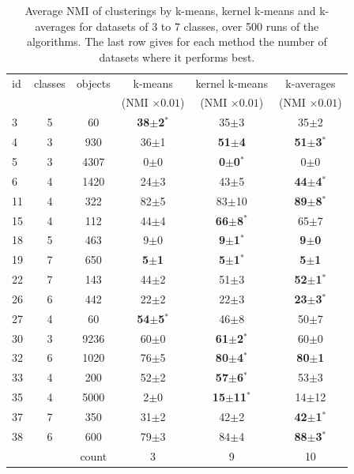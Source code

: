 \documentclass[a4paper,twoside]{article}
\begin{document}
   
\begin{table} 
\begin{center} 
\small 
 \setlength{\tabcolsep}{1em}
 \renewcommand{\arraystretch}{1.2}
\begin{tabular}{lccccc} 
id & classes & objects & k-means & kernel k-means & k-averages \\ 
&  &  & (NMI $\times 0.01$) & (NMI $\times 0.01$) & (NMI $\times 0.01$) \\ 
\hline 
 3 & 5 &   60 & \textbf{38$\pm$2$^*$} & 35$\pm$3 & 35$\pm$2 \\ 
 4 & 3 &  930 & 36$\pm$1 & \textbf{51$\pm$4} & \textbf{51$\pm$3$^*$} \\ 
 5 & 3 & 4307 & 0$\pm$0 & \textbf{0$\pm$0$^*$} & 0$\pm$0 \\ 
 6 & 4 & 1420 & 24$\pm$3 & 43$\pm$5 & \textbf{44$\pm$4$^*$} \\ 
11 & 4 &  322 &  82$\pm$5 & 83$\pm$10 & \textbf{ 89$\pm$8$^*$} \\ 
15 & 4 &  112 & 44$\pm$4 & \textbf{66$\pm$8$^*$} & 65$\pm$7 \\ 
18 & 5 &  463 & 9$\pm$0 & \textbf{9$\pm$1$^*$} & \textbf{9$\pm$0} \\ 
19 & 7 &  650 & \textbf{5$\pm$1} & \textbf{5$\pm$1$^*$} & \textbf{5$\pm$1} \\ 
22 & 7 &  143 & 44$\pm$2 & 51$\pm$3 & \textbf{52$\pm$1$^*$} \\ 
26 & 6 &  442 & 22$\pm$2 & 22$\pm$3 & \textbf{23$\pm$3$^*$} \\ 
27 & 4 &   60 & \textbf{54$\pm$5$^*$} & 46$\pm$8 & 50$\pm$7 \\ 
30 & 3 & 9236 & 60$\pm$0 & \textbf{61$\pm$2$^*$} & 60$\pm$0 \\ 
32 & 6 & 1020 & 76$\pm$5 & \textbf{80$\pm$4$^*$} & \textbf{80$\pm$1} \\ 
33 & 4 &  200 & 52$\pm$2 & \textbf{57$\pm$6$^*$} & 53$\pm$3 \\ 
35 & 4 & 5000 &   2$\pm$0 & \textbf{15$\pm$11$^*$} & 14$\pm$12 \\ 
37 & 7 &  350 & 31$\pm$2 & 42$\pm$2 & \textbf{42$\pm$1$^*$} \\ 
38 & 6 &  600 & 79$\pm$3 & 84$\pm$4 & \textbf{88$\pm$3$^*$} \\ 
\hline 
 &  & count & 3 & 9 & 10 \\ 
\end{tabular} 
\end{center} 
\caption{Average NMI of clusterings by k-means, kernel k-means and k-averages for datasets of 3 to 7 classes, over 500 runs of the algorithms. The last row gives for each method the number of datasets where it performs best.}
\label{tab:results-37}
\end{table} 
 
\end{document}
